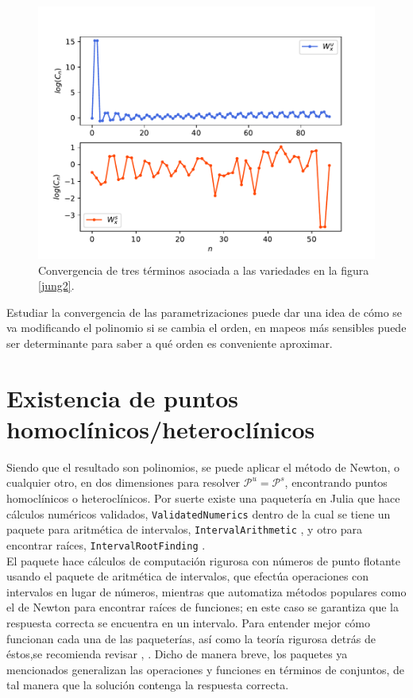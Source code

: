 \begin{figure}[H]
\centering
\includegraphics[scale=0.7]{convergenciaJungT57}
\caption{Convergencia de tres términos asociada a las variedades en la figura \ref{jung2}.}
\label{convergenciaJ3}
\end{figure}

Estudiar la convergencia de las parametrizaciones puede dar una idea de cómo se va modificando el polinomio si se cambia el orden, en mapeos más sensibles puede ser determinante para saber a qué orden es conveniente aproximar. 

\section{Existencia de puntos homoclínicos/heteroclínicos}

Siendo que el resultado son polinomios, se puede aplicar el método de Newton, o cualquier otro, en dos dimensiones para resolver $\mathcal{P}^{u}=\mathcal{P}^{s}$, encontrando puntos homoclínicos o heteroclínicos. Por suerte existe una paquetería en Julia que hace cálculos numéricos validados, \texttt{ValidatedNumerics} \cite{validated} dentro de la cual se tiene un paquete para aritmética de intervalos, \texttt{IntervalArithmetic} \citep{interval}, y otro para encontrar raíces, \texttt{IntervalRootFinding} \cite{root}.\\

El paquete \cite{validated} hace cálculos de computación rigurosa con números de punto flotante usando el paquete de aritmética de intervalos, que efectúa operaciones con intervalos en lugar de números, mientras que \cite{root} automatiza métodos populares como el de Newton para encontrar raíces de funciones; en este caso se garantiza que la respuesta correcta se encuentra en un intervalo. Para entender mejor cómo funcionan cada una de las paqueterías, así como la teoría rigurosa detrás de éstos,se recomienda revisar \cite{ramon}, \cite{Numerics}. Dicho de manera breve, los paquetes ya mencionados generalizan las operaciones y funciones en términos de conjuntos, de tal manera que la solución contenga la respuesta correcta. \\

